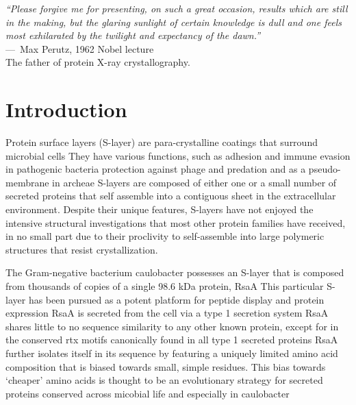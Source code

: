 \acresetall
{}
\begin{epigraph}
  \emph{``Please forgive me for presenting, on such a great occasion, results which are still in the making, but the glaring sunlight of certain knowledge is dull and one feels most exhilarated by the twilight and expectancy of the dawn.''} \\---~Max Perutz, 1962 Nobel lecture\\ The father of protein X-ray crystallography.
\end{epigraph}

\section{Introduction} %
\label{sec:crystal_introduction} 

Protein surface layers (\acs{S-layer}) are para-crystalline coatings that
surround microbial cells
 They have various functions, such as adhesion
and immune evasion in pathogenic bacteria
 protection against phage and predation
 and as a pseudo-membrane in archeae
 \acp{S-layer} are composed of either one or a small number of secreted proteins that self assemble
into a contiguous sheet in the extracellular environment. Despite their
unique features, \acp{S-layer} have not enjoyed the intensive structural
investigations that most other protein families have received, in no
small part due to their proclivity to self-assemble into large polymeric
structures that resist crystallization.

The Gram-negative bacterium \ac{caulobacter} possesses an
\ac{S-layer} that is composed from thousands of copies of a single 98.6 kDa protein, RsaA
 This particular \ac{S-layer} has been pursued as a potent platform for peptide display and
protein expression
RsaA is secreted from the cell via a type 1
secretion system
 RsaA shares little to no sequence similarity to any
other known protein, except for in the conserved \ac{rtx}
motifs canonically found in all type 1 secreted proteins
 RsaA further isolates itself in its sequence by featuring a uniquely limited amino
acid composition that is biased towards small, simple residues. This bias
towards `cheaper' amino acids is thought to be an evolutionary strategy
for secreted proteins conserved across micobial life and especially in
\ac{caulobacter}

